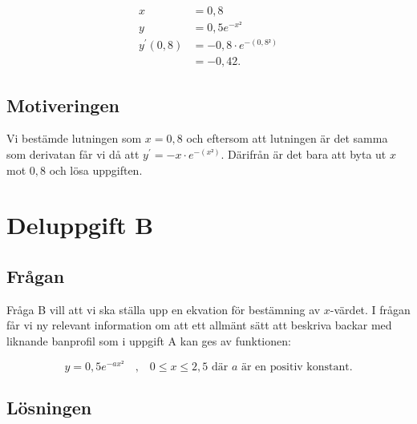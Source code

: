 \documentclass[a4paper,12pt]{article}
\begin{document}
    \begin{align}
      \label{eq:3}
      x &= 0,8 \nonumber \\
      y &= 0,5e^{-x²} \nonumber \\
      y^{\prime}(0,8) &= -0,8 \cdot e^{-(0,8²)} \\
      &=-0,42. \nonumber
    \end{align}

  \subsection{Motiveringen}

    Vi bestämde lutningen som $x = 0,8$ och eftersom att lutningen är det samma
    som derivatan får vi då att $y^{\prime} = -x \cdot e^{-(x²)}$. Därifrån är 
    det bara att byta ut $x$ mot $0,8$ och lösa uppgiften.

\section{Deluppgift B}
\label{sec:uppg2}

    \subsection{Frågan}

      Fråga B vill att vi ska ställa upp en ekvation för bestämning av 
      $x$-värdet.
      I frågan får vi ny relevant information om att ett allmänt sätt att 
      beskriva backar med liknande banprofil som i uppgift A kan ges av 
      funktionen: 

      \begin{displaymath}
        y = 0,5e^{-ax²}
        \quad \text{,} \quad
        0 \le x \le 2,5 
        \text{ där } a \text{ är en positiv konstant.}
      \end{displaymath}

    \subsection{Lösningen}
\end{document}
